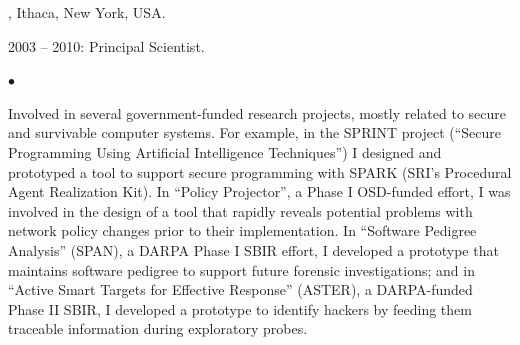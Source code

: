 \documentclass[12pt,a4paper]{article}
\newenvironment{list1}{
  \begin{list}{\ding{113}}{%
      \setlength{\itemsep}{0in}
      \setlength{\parsep}{0in} \setlength{\parskip}{0in}
      \setlength{\topsep}{0in} \setlength{\partopsep}{0in}
      \setlength{\leftmargin}{0.17in}}}{\end{list}}
\newenvironment{list2}{
  \begin{list}{$\bullet$}{%
      \setlength{\itemsep}{0in}
      \setlength{\parsep}{0in} \setlength{\parskip}{0in}
      \setlength{\topsep}{0in} \setlength{\partopsep}{0in}
      \setlength{\leftmargin}{0.2in}}}{\end{list}}
\begin{document}
, Ithaca, New York, USA.
\begin{list1}
\item[]  2003 -- 2010:  Principal Scientist.
\begin{list2}
\item[] Involved in several government-funded research projects, mostly related to
secure and survivable computer systems.  For example, in the SPRINT project
(``Secure Programming Using Artificial Intelligence Techniques'') I designed and
prototyped a tool to support secure programming with SPARK (SRI's Procedural
Agent Realization Kit).
 In ``Policy Projector'', a Phase I OSD-funded effort, I was involved in the
design of a tool that rapidly reveals potential problems with network policy
changes prior to their implementation.  In ``Software Pedigree Analysis''
(SPAN), a DARPA Phase I SBIR effort, I developed a prototype that maintains
software pedigree to support future forensic investigations; and in ``Active
Smart Targets for Effective Response'' (ASTER), a DARPA-funded Phase II SBIR, I
developed a prototype to identify hackers by feeding them traceable information
during exploratory probes.
\end{list2}
\end{list1}
\end{document}
